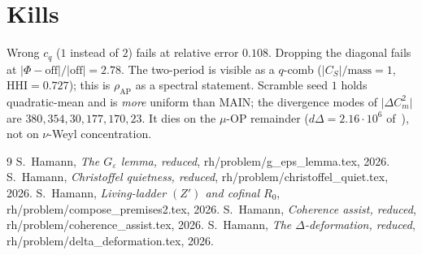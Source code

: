 \documentclass[11pt]{article}
\theoremstyle{remark}
\begin{document}
\section{Kills}\label{sec:kills}

Wrong $c_q$ ($1$ instead of $2$) fails at relative error $0.108$.
Dropping the diagonal fails at $\lvert\Phi-\mathrm{off}\rvert/\lvert\mathrm{off}\rvert=2.78$.
The two-period is visible as a $q$-comb ($\lvert C_S\rvert/\mathrm{mass}=1$,
$\mathrm{HHI}=0.727$); this is $\rho_{\mathrm{AP}}$ as a spectral statement.
Scramble seed $1$ holds quadratic-mean and is \emph{more} uniform than MAIN;
the divergence modes of $\lvert\Delta C_m^2\rvert$ are
$380,354,30,177,170,23$.
It dies on the $\mu$-OP remainder ($d\Delta=2.16\cdot10^6$ of~\cite{r388}),
not on $\nu$-Weyl concentration.

\begin{thebibliography}{9}
 S.~Hamann, \emph{The $G_\varepsilon$ lemma, reduced},
rh/problem/g\_eps\_lemma.tex, 2026.
 S.~Hamann, \emph{Christoffel quietness, reduced},
rh/problem/christoffel\_quiet.tex, 2026.
 S.~Hamann, \emph{Living-ladder $(Z')$ and cofinal $R_0$},
rh/problem/compose\_premises2.tex, 2026.
 S.~Hamann, \emph{Coherence assist, reduced},
rh/problem/coherence\_assist.tex, 2026.
 S.~Hamann, \emph{The $\Delta$-deformation, reduced},
rh/problem/delta\_deformation.tex, 2026.
\end{thebibliography}
\end{document}
